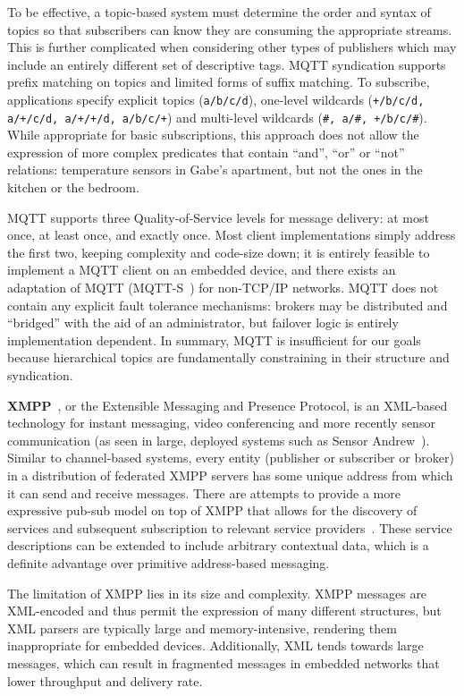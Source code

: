 To be effective, a topic-based system must determine the order and syntax of topics so that subscribers can know they are consuming the appropriate streams.
This is further complicated when considering other types of publishers which may include an entirely different set of descriptive tags.
MQTT syndication supports prefix matching on topics and limited forms of suffix matching.
To subscribe, applications specify explicit topics (\texttt{a/b/c/d}), one-level wildcards (\texttt{+/b/c/d, a/+/c/d, a/+/+/d, a/b/c/+}) and multi-level wildcards (\texttt{\#, a/\#, +/b/c/\#}).
While appropriate for basic subscriptions, this approach does not allow the expression of more complex predicates that contain ``and'', ``or'' or ``not'' relations: temperature sensors in Gabe's apartment, but not the ones in the kitchen or the bedroom.

MQTT supports three Quality-of-Service levels for message delivery: at most once, at least once, and exactly once.
Most client implementations simply address the first two, keeping complexity and code-size down; it is entirely feasible to implement a MQTT client on an embedded device, and there exists an adaptation of MQTT (MQTT-S~\cite{hunkeler2008mqtt}) for non-TCP/IP networks.
MQTT does not contain any explicit fault tolerance mechanisms: brokers may be distributed and ``bridged'' with the aid of an administrator, but failover logic is entirely implementation dependent.
In summary, MQTT is insufficient for our goals because hierarchical topics are fundamentally constraining in their structure and syndication.

\textbf{XMPP}~\cite{saint2011extensible}, or the Extensible Messaging and Presence Protocol, is an XML-based technology for instant messaging, video conferencing and more recently sensor communication (as seen in large, deployed systems such as Sensor Andrew~\cite{rowe2011sensor}).
Similar to channel-based systems, every entity (publisher or subscriber or broker) in a distribution of federated XMPP servers has some unique address from which it can send and receive messages.
There are attempts to provide a more expressive pub-sub model on top of XMPP that allows for the discovery of services and subsequent subscription to relevant service providers~\cite{millard2010xep}.
These service descriptions can be extended to include arbitrary contextual data, which is a definite advantage over primitive address-based messaging.

The limitation of XMPP lies in its size and complexity.
XMPP messages are XML-encoded and thus permit the expression of many different structures, but XML parsers are typically large and memory-intensive, rendering them inappropriate for embedded devices.
Additionally, XML tends towards large messages, which can result in fragmented messages in embedded networks that lower throughput and delivery rate.

